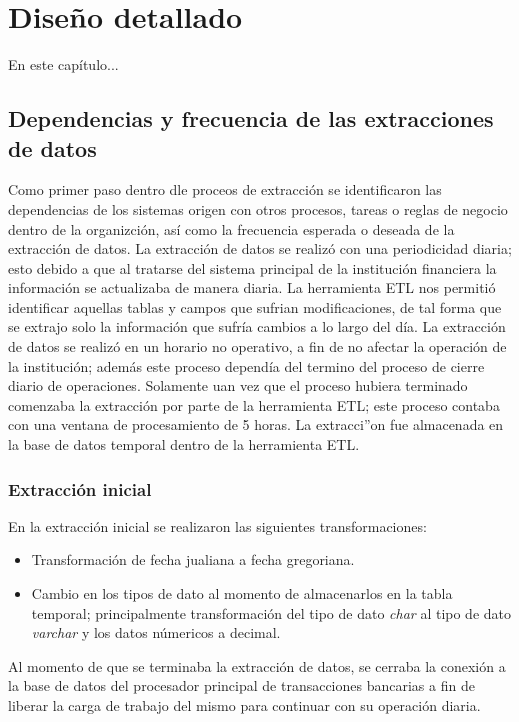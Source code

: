 \chapter{Diseño detallado}
\label{cap:diseno-detallado}

En este capítulo...

\section{Dependencias y frecuencia de las extracciones de datos}

Como primer paso dentro dle proceos de extracción se identificaron las
dependencias de los sistemas origen con otros procesos, tareas o reglas de
negocio dentro de la organizción, así como la frecuencia esperada o deseada de
la extracción de datos. La extracción de datos se realizó con una periodicidad
diaria; esto debido a que al tratarse del sistema principal de la institución
financiera la información se actualizaba de manera diaria. La herramienta ETL
nos permitió identificar aquellas tablas y campos que sufrian modificaciones, de
tal forma que se extrajo solo la información que sufría cambios a lo largo del
día. La extracción de datos se realizó en un horario no operativo, a fin de no
afectar la operación de la institución; además este proceso dependía del termino
del proceso de cierre diario de operaciones. Solamente uan vez que el proceso
hubiera terminado comenzaba la extracción por parte de la herramienta ETL; este
proceso contaba con una ventana de procesamiento de 5 horas. La extracci''on fue
almacenada en la base de datos temporal dentro de la herramienta ETL.

\subsection{Extracción inicial}

En la extracción inicial se realizaron las siguientes transformaciones:

\begin{itemize}
\item Transformación de fecha jualiana a fecha gregoriana.
\item Cambio en los tipos de dato al momento de almacenarlos en la tabla
  temporal; principalmente transformación del tipo de dato \textit{char} al tipo
  de dato \textit{varchar} y los datos númericos a decimal.
\end{itemize}

Al momento de que se terminaba la extracción de datos, se cerraba la conexión a
la base de datos del procesador principal de transacciones bancarias a fin de
liberar la carga de trabajo del mismo para continuar con su operación diaria.

